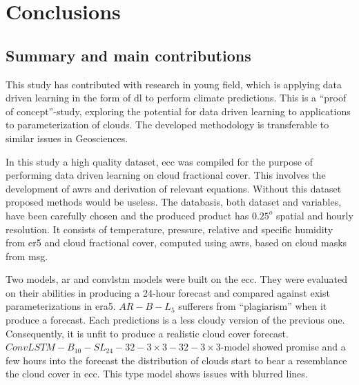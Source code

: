 \chapter{Conclusions}
\section{Summary and main contributions}
This study has contributed with research in young field, which is applying data driven learning in the form of \acrshort{dl} to perform climate predictions.
This is a ``proof of concept''-study, exploring the potential for data driven learning to applications to parameterization of clouds. The developed methodology is transferable to similar issues in Geosciences.

In this study a high quality dataset, \acrfull{ecc} was compiled for the purpose of performing data driven learning on cloud fractional cover. This involves the development of \acrfull{awrs} and derivation of relevant equations. Without this dataset proposed methods would be useless. The databasis, both dataset and variables, have been carefully chosen and the produced product has $0.25^o$ spatial and hourly resolution. It consists of temperature, pressure, relative and specific humidity from \acrshort{er5} and cloud fractional cover, computed using \acrshort{awrs}, based on cloud masks from \acrshort{msg}.

Two models, \acrfull{ar} and \acrfull{convlstm} models were built on the \acrshort{ecc}. They were evaluated on their abilities in producing a 24-hour forecast and compared against exist parameterizations in \acrshort{era5}. 
$AR-B-L_5$ sufferers from ``plagiarism'' when it produce a forecast. Each predictions is a less cloudy version of the previous one. Consequently, it is unfit to produce a realistic cloud cover forecast.  $ConvLSTM-B_{10}-SL_{24}-32-3\times3-32-3 \times3$-model showed promise and a few hours into the forecast the distribution of clouds start to bear a resemblance the cloud cover in \acrshort{ecc}. This type model shows issues with blurred lines. 

